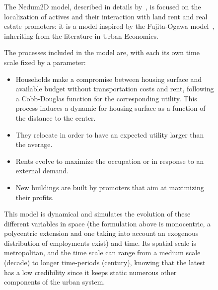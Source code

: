 \documentclass[galley]{jtlu-article-2col}
\begin{document}
\begin{figure}
	\begin{mdframed}
	
	The Nedum2D model, described in details by~\cite{viguie2014downscaling}, is focused on the localization of actives and their interaction with land rent and real estate promoters: it is a model inspired by the Fujita-Ogawa model~\cite{fujita1982multiple}, inheriting from the literature in Urban Economics.
	
	The processes included in the model are, with each its own time scale fixed by a parameter:
	\begin{itemize}
		\item Households make a compromise between housing surface and available budget without transportation costs and rent, following a Cobb-Douglas function for the corresponding utility. This process induces a dynamic for housing surface as a function of the distance to the center.
		\item They relocate in order to have an expected utility larger than the average.
		\item Rents evolve to maximize the occupation or in response to an external demand.
		\item New buildings are built by promoters that aim at maximizing their profits.
	\end{itemize}
	
	
	This model is dynamical and simulates the evolution of these different variables in space (the formulation above is monocentric, a polycentric extension and one taking into account an exogenous distribution of employments exist) and time. Its spatial scale is metropolitan, and the time scale can range from a medium scale (decade) to longer time-periods (century), knowing that the latest has a low credibility since it keeps static numerous other components of the urban system.
	
		
	\medskip
	

\end{mdframed}
\end{figure}
\end{document}

